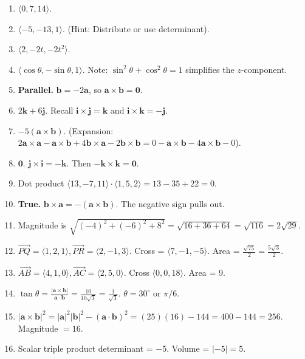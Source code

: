 \documentclass[11pt]{article}
\begin{document}
\begin{enumerate}
    \item $\langle 0, 7, 14 \rangle$.
    \item $\langle -5, -13, 1 \rangle$. (Hint: Distribute or use determinant).
    \item $\langle 2, -2t, -2t^2 \rangle$.
    \item $\langle \cos\theta, -\sin\theta, 1 \rangle$. Note: $\sin^2\theta + \cos^2\theta = 1$ simplifies the $z$-component.
    \item \textbf{Parallel.} $\mathbf{b} = -2\mathbf{a}$, so $\mathbf{a} \times \mathbf{b} = \mathbf{0}$.
    \item $2\mathbf{k} + 6\mathbf{j}$. Recall $\mathbf{i} \times \mathbf{j} = \mathbf{k}$ and $\mathbf{i} \times \mathbf{k} = -\mathbf{j}$.
    \item $-5(\mathbf{a} \times \mathbf{b})$. (Expansion: $2\mathbf{a}\times\mathbf{a} - \mathbf{a}\times\mathbf{b} + 4\mathbf{b}\times\mathbf{a} - 2\mathbf{b}\times\mathbf{b} = 0 - \mathbf{a}\times\mathbf{b} - 4\mathbf{a}\times\mathbf{b} - 0$).
    \item $\mathbf{0}$. $\mathbf{j} \times \mathbf{i} = -\mathbf{k}$. Then $-\mathbf{k} \times \mathbf{k} = \mathbf{0}$.
    \item Dot product $\langle 13, -7, 11 \rangle \cdot \langle 1, 5, 2 \rangle = 13 - 35 + 22 = 0$.
    \item \textbf{True.} $\mathbf{b} \times \mathbf{a} = -(\mathbf{a} \times \mathbf{b})$. The negative sign pulls out.
    \item Magnitude is $\sqrt{(-4)^2 + (-6)^2 + 8^2} = \sqrt{16+36+64} = \sqrt{116} = 2\sqrt{29}$.
    \item $\vec{PQ} = \langle 1, 2, 1 \rangle, \vec{PR} = \langle 2, -1, 3 \rangle$. Cross = $\langle 7, -1, -5 \rangle$. Area = $\frac{\sqrt{75}}{2} = \frac{5\sqrt{3}}{2}$.
    \item $\vec{AB}=\langle 4, 1, 0 \rangle, \vec{AC}=\langle 2, 5, 0 \rangle$. Cross $\langle 0, 0, 18 \rangle$. Area = 9.
    \item $\tan\theta = \frac{|\mathbf{a}\times\mathbf{b}|}{\mathbf{a}\cdot\mathbf{b}} = \frac{10}{10\sqrt{3}} = \frac{1}{\sqrt{3}}$. $\theta = 30^\circ$ or $\pi/6$.
    \item $|\mathbf{a}\times\mathbf{b}|^2 = |\mathbf{a}|^2|\mathbf{b}|^2 - (\mathbf{a}\cdot\mathbf{b})^2 = (25)(16) - 144 = 400 - 144 = 256$. Magnitude $= 16$.
    \item Scalar triple product determinant = $-5$. Volume = $|-5| = 5$.

\end{enumerate}
\end{document}
